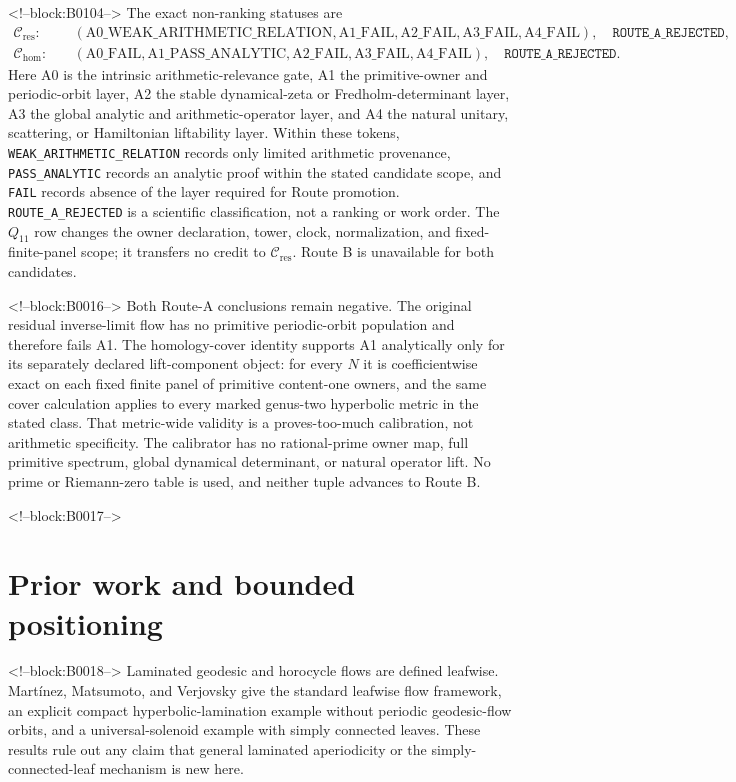 \documentclass[11pt]{article}
\theoremstyle{definition}
\theoremstyle{remark}
\begin{document}
<!--block:B0104-->
The exact non-ranking statuses are
\[
\begin{aligned}
\mathcal C_{\mathrm{res}}:&\quad
(\mathrm{A0\_WEAK\_ARITHMETIC\_RELATION},\mathrm{A1\_FAIL},\mathrm{A2\_FAIL},\mathrm{A3\_FAIL},\mathrm{A4\_FAIL}),
\quad\texttt{ROUTE\_A\_REJECTED},\\
\mathcal C_{\mathrm{hom}}:&\quad
(\mathrm{A0\_FAIL},\mathrm{A1\_PASS\_ANALYTIC},\mathrm{A2\_FAIL},\mathrm{A3\_FAIL},\mathrm{A4\_FAIL}),
\quad\texttt{ROUTE\_A\_REJECTED}.
\end{aligned}
\]
Here A0 is the intrinsic arithmetic-relevance gate, A1 the primitive-owner and periodic-orbit layer, A2 the stable dynamical-zeta or Fredholm-determinant layer, A3 the global analytic and arithmetic-operator layer, and A4 the natural unitary, scattering, or Hamiltonian liftability layer. Within these tokens, \texttt{WEAK\_ARITHMETIC\_RELATION} records only limited arithmetic provenance, \texttt{PASS\_ANALYTIC} records an analytic proof within the stated candidate scope, and \texttt{FAIL} records absence of the layer required for Route promotion. \texttt{ROUTE\_A\_REJECTED} is a scientific classification, not a ranking or work order. The $Q_{11}$ row changes the owner declaration, tower, clock, normalization, and fixed-finite-panel scope; it transfers no credit to $\mathcal C_{\mathrm{res}}$. Route B is unavailable for both candidates.

<!--block:B0016-->
Both Route-A conclusions remain negative. The original residual inverse-limit flow has no primitive periodic-orbit population and therefore fails A1. The homology-cover identity supports A1 analytically only for its separately declared lift-component object: for every $N$ it is coefficientwise exact on each fixed finite panel of primitive content-one owners, and the same cover calculation applies to every marked genus-two hyperbolic metric in the stated class. That metric-wide validity is a proves-too-much calibration, not arithmetic specificity. The calibrator has no rational-prime owner map, full primitive spectrum, global dynamical determinant, or natural operator lift. No prime or Riemann-zero table is used, and neither tuple advances to Route B.

<!--block:B0017-->
\section{Prior work and bounded positioning}

<!--block:B0018-->
Laminated geodesic and horocycle flows are defined leafwise. Martínez, Matsumoto, and Verjovsky give the standard leafwise flow framework, an explicit compact hyperbolic-lamination example without periodic geodesic-flow orbits, and a universal-solenoid example with simply connected leaves.
\citep[Section~2.2 and Examples~4, 6]{martinez2016}
These results rule out any claim that general laminated aperiodicity or the simply-connected-leaf mechanism is new here.
\end{document}
